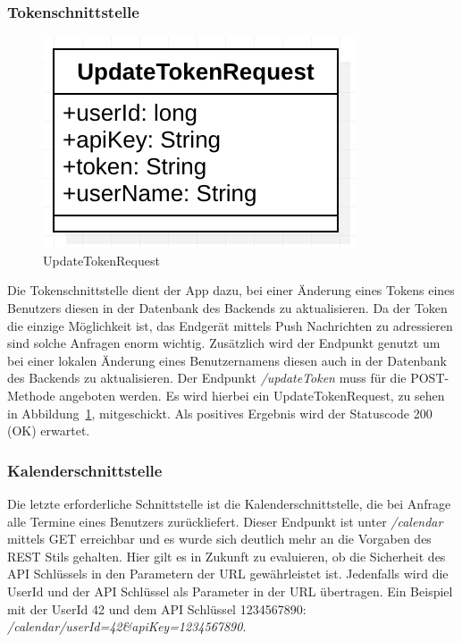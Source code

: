 \subsubsection{Tokenschnittstelle}
\begin{figure}[h]
	\centering
	\includegraphics{include/img/updatetokenrequest}
	\caption{UpdateTokenRequest}
	\label{fig:updateTokenRequest}
\end{figure}
Die Tokenschnittstelle dient der App dazu, bei einer Änderung eines Tokens eines Benutzers diesen in der Datenbank des Backends zu aktualisieren. Da der Token die einzige Möglichkeit ist, das Endgerät mittels Push Nachrichten zu adressieren sind solche Anfragen enorm wichtig. Zusätzlich wird der Endpunkt genutzt um bei einer lokalen Änderung eines Benutzernamens diesen auch in der Datenbank des Backends zu aktualisieren. Der Endpunkt \textit{/updateToken} muss für die POST-Methode angeboten werden. Es wird hierbei ein UpdateTokenRequest, zu sehen in Abbildung~\ref{fig:updateTokenRequest}, mitgeschickt. Als positives Ergebnis wird der Statuscode 200 (OK) erwartet.

\subsubsection{Kalenderschnittstelle}
Die letzte erforderliche Schnittstelle ist die Kalenderschnittstelle, die bei Anfrage alle Termine eines Benutzers zurückliefert. Dieser Endpunkt ist unter \textit{/calendar} mittels GET erreichbar und es wurde sich deutlich mehr an die Vorgaben des REST Stils gehalten. Hier gilt es in Zukunft zu evaluieren, ob die Sicherheit des API Schlüssels in den Parametern der URL gewährleistet ist. Jedenfalls wird die UserId und der API Schlüssel als Parameter in der URL übertragen. Ein Beispiel mit der UserId 42 und dem API Schlüssel 1234567890: \textit{/calendar/userId=42\&apiKey=1234567890}.

